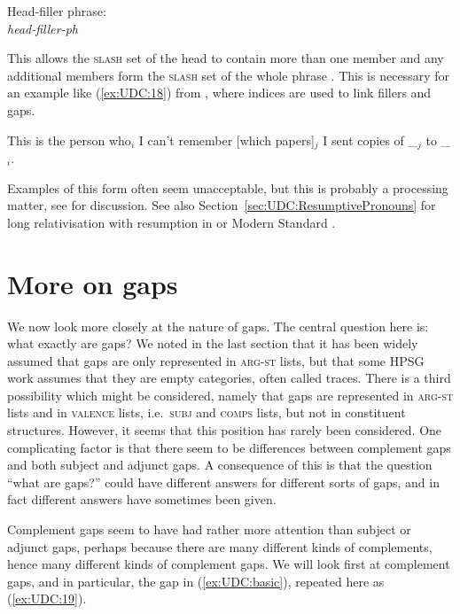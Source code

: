 \documentclass[output=paper
,notxmath 
	        ,collection
	        ,collectionchapter
 	        ,biblatex
                ,babelshorthands
                ,newtxmath
                ,draftmode
                ,colorlinks, citecolor=brown
]{langscibook}
\begin{document}
\eas
\label{fig:UDC:17}
Head-filler phrase:\\
\emph{head-filler-ph} \impl\\
\zs

\noindent
This allows the \textsc{slash} set of the head to contain more than one member
and any additional members form the \textsc{slash} set of the whole phrase . This
is necessary for an example like (\ref{ex:UDC:18}) from \citet[473]{Chaves:12}, where indices
are used to link fillers and gaps.

\ea
\label{ex:UDC:18}
This is the person who$_i$ I can't remember [which papers]$_j$ I sent copies of \_$_j$ to \_$_i$.
\z

\noindent
Examples of this form often seem unacceptable, but this is probably a
processing matter, see \citet[Section~3]{Chaves:12} for discussion.
See also Section~\ref{sec:UDC:ResumptivePronouns} for long
relativisation with resumption in  or Modern Standard .

\section{More on gaps}
\label{sec:UDC:MoreOnGaps}


We now look more closely at the nature of gaps. The central question
here is: what exactly are gaps? We noted in the last section that it
has been widely assumed that gaps are only represented in
\textsc{arg-st} lists, but that some HPSG work assumes that they are
empty categories, often called traces. There is a third possibility
which might be considered, namely that gaps are represented in
\textsc{arg-st} lists and in \textsc{valence} lists,
i.e.\ \textsc{subj} and \textsc{comps} lists, but not in constituent
structures. However, it seems that this position has rarely been
considered. One complicating factor is that there seem to be
differences between complement gaps and both subject and adjunct
gaps. A consequence of this is that the question ``what are gaps?''
could have different answers for different sorts of gaps, and in fact
different answers have sometimes been given.

Complement gaps seem to have had rather more attention than subject or
adjunct gaps, perhaps because there are many different kinds of
complements, hence many different kinds of complement gaps. We will look
first at complement gaps, and in particular, the gap in (\ref{ex:UDC:basic}), repeated
here as (\ref{ex:UDC:19}).
\end{document}
